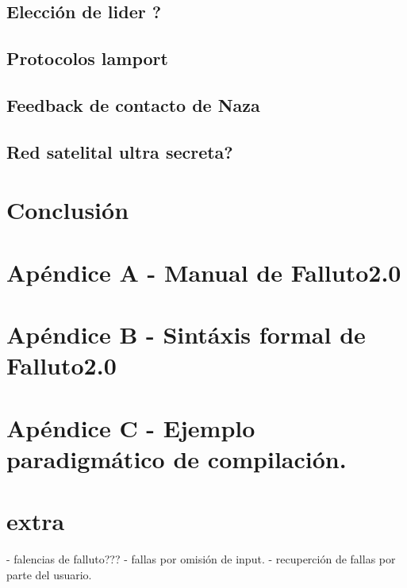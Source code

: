 \documentclass[titlepage, 12pt]{book}
\begin{document}
			\section{Elecci\'on de lider ?}
			\section{Protocolos lamport}
			\section{Feedback de contacto de Naza}
			\section{Red satelital ultra secreta?}


\chapter{Conclusi\'on}

\chapter{Ap\'endice A - Manual de Falluto2.0}

\chapter{Ap\'endice B - Sint\'axis formal de Falluto2.0}

\chapter{Ap\'endice C - Ejemplo paradigm\'atico de compilaci\'on.}




\chapter{extra}
	- falencias de falluto??? 
	- fallas por omisi\'on de input.
	- recuperci\'on de fallas por parte del usuario.
\end{document}
